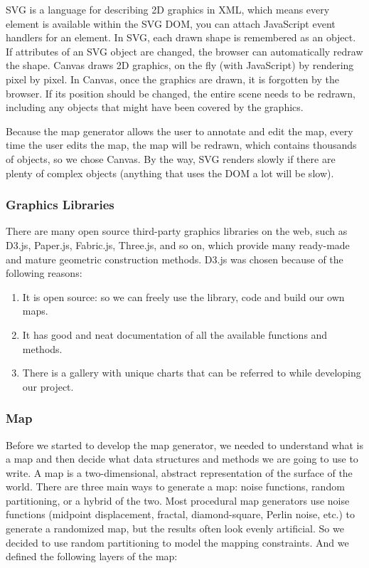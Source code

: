 SVG is a language for describing 2D graphics in XML, which means every element is available within the SVG DOM, you can attach JavaScript event handlers for an element. In SVG, each drawn shape is remembered as an object. If attributes of an SVG object are changed, the browser can automatically redraw the shape. Canvas draws 2D graphics, on the fly (with JavaScript) by rendering pixel by pixel. In Canvas, once the graphics are drawn, it is forgotten by the browser. If its position should be changed, the entire scene needs to be redrawn, including any objects that might have been covered by the graphics.

Because the map generator allows the user to annotate and edit the map, every time the user edits the map, the map will be redrawn, which contains thousands of objects, so we chose Canvas. By the way, SVG renders slowly if there are plenty of complex objects (anything that uses the DOM a lot will be slow).

\subsubsection{Graphics Libraries}
\label{sec:Design>Map Generator Design>Graphics Libraries}
There are many open source third-party graphics libraries on the web, such as D3.js, Paper.js, Fabric.js, Three.js, and so on, which provide many ready-made and mature geometric construction methods. D3.js was chosen because of the following reasons:
\begin{enumerate}
  \item It is open source: so we can freely use the library, code and build our own maps.
  \item It has good and neat documentation of all the available functions and methods.
  \item There is a gallery with unique charts that can be referred to while developing our project.
\end{enumerate}

\subsubsection{Map}
\label{sec:Design>Map Generator Design>Map}
Before we started to develop the map generator, we needed to understand what is a map and then decide what data structures and methods we are going to use to write. A map is a two-dimensional, abstract representation of the surface of the world. There are three main ways to generate a map: noise functions, random partitioning, or a hybrid of the two. Most procedural map generators use noise functions (midpoint displacement, fractal, diamond-square, Perlin noise, etc.) to generate a randomized map, but the results often look evenly artificial. So we decided to use random partitioning to model the mapping constraints. And we defined the following layers of the map:

